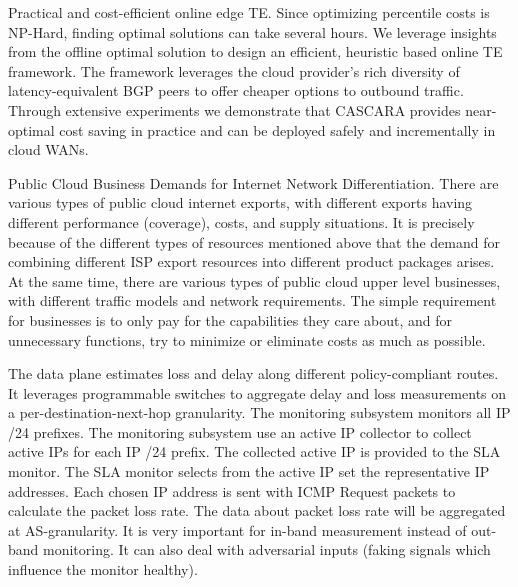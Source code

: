 Practical and cost-efficient online edge TE. Since optimizing percentile costs is NP-Hard, finding optimal solutions can take several hours. We leverage insights from the offline optimal solution to design an efficient, heuristic based online TE framework. The framework leverages the cloud provider’s rich diversity of latency-equivalent BGP peers to offer cheaper options to outbound traffic. Through extensive experiments we demonstrate that CASCARA provides near-optimal cost saving in practice and can be deployed safely and incrementally in cloud WANs. 

Public Cloud Business Demands for Internet Network Differentiation. There are various types of public cloud internet exports, with different exports having different performance (coverage), costs, and supply situations. It is precisely because of the different types of resources mentioned above that the demand for combining different ISP export resources into different product packages arises. At the same time, there are various types of public cloud upper level businesses, with different traffic models and network requirements. The simple requirement for businesses is to only pay for the capabilities they care about, and for unnecessary functions, try to minimize or eliminate costs as much as possible.

The data plane estimates loss and delay along different policy-compliant routes. It leverages programmable switches to aggregate delay and loss measurements on a per-destination-next-hop granularity. 
The monitoring subsystem monitors all IP /24 prefixes. The monitoring subsystem use an active IP collector to collect active IPs for each IP /24 prefix. The collected active IP is provided to the SLA monitor. The SLA monitor selects from the active IP set the representative IP addresses. Each chosen IP address is sent with ICMP Request packets to calculate the packet loss rate. The data about packet loss rate will be aggregated at AS-granularity. It is very important for in-band measurement instead of out-band monitoring. It can also deal with adversarial inputs (faking signals which influence the monitor healthy). 


